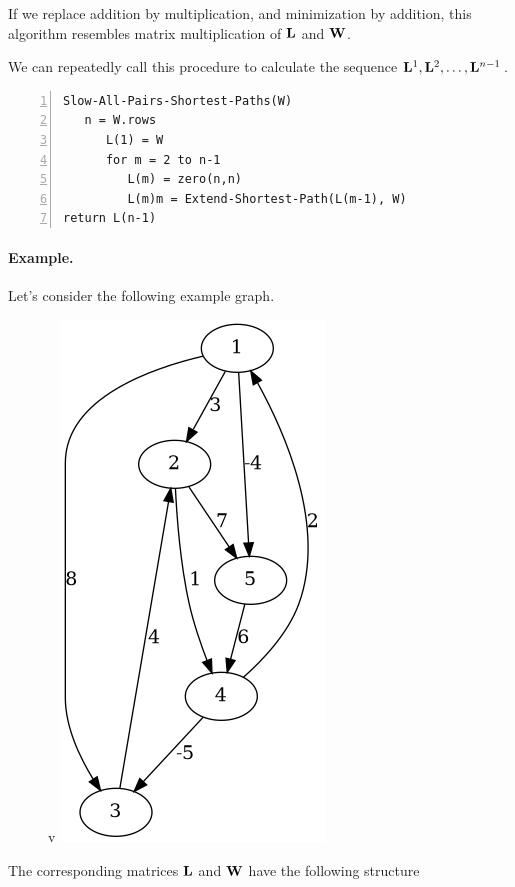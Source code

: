 If we replace addition by multiplication, and minimization by addition, this algorithm resembles matrix multiplication of $\mathbf{L}$ and $\mathbf{W}$.

We can repeatedly call this procedure to calculate the sequence $\mathbf{L}^1, \mathbf{L}^2,\ldots, \mathbf{L}^{n-1}$.

\begin{Verbatim}[numbers=left, xleftmargin=5mm]
Slow-All-Pairs-Shortest-Paths(W)
   n = W.rows
      L(1) = W
      for m = 2 to n-1
         L(m) = zero(n,n)
         L(m)m = Extend-Shortest-Path(L(m-1), W)
return L(n-1)
\end{Verbatim}

\paragraph{Example.} Let's consider the following example graph.

\begin{figure}[H]v
\centering
\includegraphics[scale=0.5]{images/apsp_01.png}
\end{figure}

The corresponding matrices $\mathbf{L}$ and $\mathbf{W}$ have the following structure

